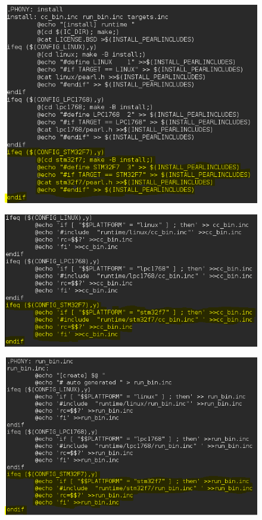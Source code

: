 \documentclass[12pt,a4paper]{article}
\begin{document}
\begin{figure}[h]
\begin{center}
\includegraphics[width=15cm]{grafiken/Makefile_runtime3.png}
\end{center}
\end{figure}
\clearpage
\begin{figure}[h]
\begin{center}
\includegraphics[width=16cm]{grafiken/Makefile_runtime4.png}
\end{center}
\end{figure}

\begin{figure}[h]
\begin{center}
\includegraphics[width=16cm]{grafiken/Makefile_runtime5.png}
\end{center}
\end{figure}
\clearpage
\end{document}
